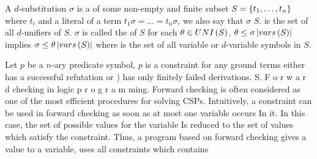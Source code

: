 \begin{defi}
A $d$-substitution $\sigma$ is a  of some non-empty and finite subset $S=\left\{ t_1,\ldots,t_n\right\}$ where $t_i$ and a literal of a term \iffTx{} $t_1\sigma=\ldots=t_n\sigma$, we also say that $\sigma$  $S$.  is the set of all $d$-unifiers of $S$. $\sigma$ is called the  of $S$ \iffTx for each $\theta\in UNI\left(S\right)$, $\theta\leq\sigma\left|vars\left(S\right)\right|$ implies $\sigma\leq\theta\left|vars\left(S\right)\right|$ where  is the set of all variable or $d$-variable symbols in $S$.
\cite{conf/ijcai/Hentenryck87}
\end{defi}

\begin{defi}
Let $p$ be a $n$-ary predicate symbol, $p$ is a constraint \iffTx for any ground terms either
has a successful refutation or
) has
only finitely failed derivations.
S. F o r w a r d checking in logic p r o g r a m ming.
Forward checking is often considered as one of the most
efficient procedures for solving CSPs. Intuitively, a constraint
can be used in forward checking as soon as at most one
variable occurs In it. In this case, the set of possible values
for the variable Is reduced to the set of values which satisfy
the constraint. Thus, a program based on forward checking
gives a value to a variable, uses all constraints which contains
\cite{conf/ijcai/Hentenryck87}
\end{defi}
%
%
